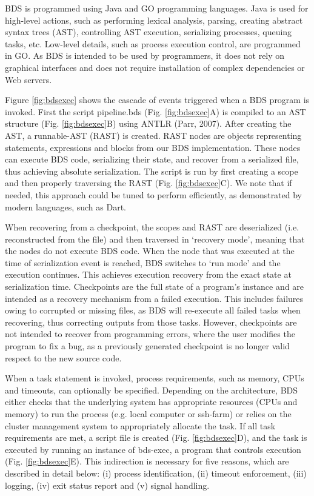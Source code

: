 BDS is programmed using Java and GO programming languages. Java is used for high-level actions, such as performing lexical analysis, parsing, creating abstract syntax trees (AST), controlling AST execution, serializing processes, queuing tasks, etc. Low-level details, such as process execution control, are programmed in GO. As BDS is intended to be used by programmers, it does not rely on graphical interfaces and does not require installation of complex dependencies or Web servers.

Figure \ref{fig:bdsexec} shows the cascade of events triggered when a BDS program is invoked. First the script pipeline.bds (Fig. \ref{fig:bdsexec}A) is compiled to an AST structure (Fig. \ref{fig:bdsexec}B) using ANTLR (Parr, 2007). After creating the AST, a runnable-AST (RAST) is created. RAST nodes are objects representing statements, expressions and blocks from our BDS implementation. These nodes can execute BDS code, serializing their state, and recover from a serialized file, thus achieving absolute serialization. The script is run by first creating a scope and then properly traversing the RAST (Fig. \ref{fig:bdsexec}C). We note that if needed, this approach could be tuned to perform efficiently, as demonstrated by modern languages, such as Dart.

When recovering from a checkpoint, the scopes and RAST are deserialized (i.e. reconstructed from the file) and then traversed in ‘recovery mode’, meaning that the nodes do not execute BDS code. When the node that was executed at the time of serialization event is reached, BDS switches to ‘run mode’ and the execution continues. This achieves execution recovery from the exact state at serialization time. Checkpoints are the full state of a program’s instance and are intended as a recovery mechanism from a failed execution. This includes failures owing to corrupted or missing files, as BDS will re-execute all failed tasks when recovering, thus correcting outputs from those tasks. However, checkpoints are not intended to recover from programming errors, where the user modifies the program to fix a bug, as a previously generated checkpoint is no longer valid respect to the new source code.

When a task statement is invoked, process requirements, such as memory, CPUs and timeouts, can optionally be specified. Depending on the architecture, BDS either checks that the underlying system has appropriate resources (CPUs and memory) to run the process (e.g. local computer or ssh-farm) or relies on the cluster management system to appropriately allocate the task. If all task requirements are met, a script file is created (Fig. \ref{fig:bdsexec}D), and the task is executed by running an instance of bds-exec, a program that controls execution (Fig. \ref{fig:bdsexec}E). This indirection is necessary for five reasons, which are described in detail below: (i) process identification, (ii) timeout enforcement, (iii) logging, (iv) exit status report and (v) signal handling.

